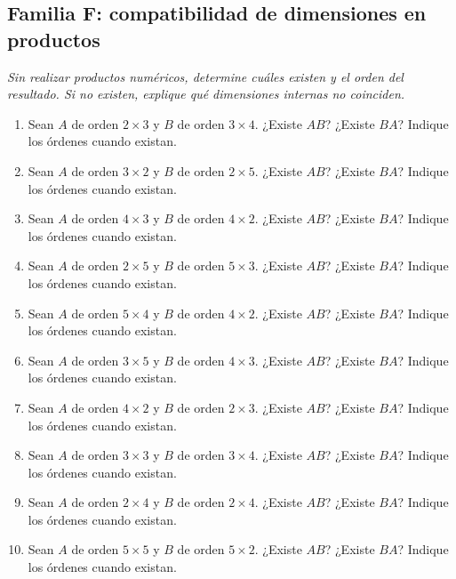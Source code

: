 \documentclass[12pt]{article}
\theoremstyle{remark}
\newcounter{contadorEjercicio}
\newenvironment{listaejercicios}{\begin{enumerate}[label=\textbf{E\arabic*.},leftmargin=2.4em,itemsep=0.52em]\setcounter{enumi}{\value{contadorEjercicio}}}{\setcounter{contadorEjercicio}{\value{enumi}}\end{enumerate}}
\begin{document}
\subsection{Familia F: compatibilidad de dimensiones en productos}\noindent\textit{Sin realizar productos numéricos, determine cuáles existen y el orden del resultado. Si no existen, explique qué dimensiones internas no coinciden.}\par\medskip
\begin{listaejercicios}

\item Sean $A$ de orden $2\times3$ y $B$ de orden $3\times4$. ¿Existe $AB$? ¿Existe $BA$? Indique los órdenes cuando existan.

\item Sean $A$ de orden $3\times2$ y $B$ de orden $2\times5$. ¿Existe $AB$? ¿Existe $BA$? Indique los órdenes cuando existan.

\item Sean $A$ de orden $4\times3$ y $B$ de orden $4\times2$. ¿Existe $AB$? ¿Existe $BA$? Indique los órdenes cuando existan.

\item Sean $A$ de orden $2\times5$ y $B$ de orden $5\times3$. ¿Existe $AB$? ¿Existe $BA$? Indique los órdenes cuando existan.

\item Sean $A$ de orden $5\times4$ y $B$ de orden $4\times2$. ¿Existe $AB$? ¿Existe $BA$? Indique los órdenes cuando existan.

\item Sean $A$ de orden $3\times5$ y $B$ de orden $4\times3$. ¿Existe $AB$? ¿Existe $BA$? Indique los órdenes cuando existan.

\item Sean $A$ de orden $4\times2$ y $B$ de orden $2\times3$. ¿Existe $AB$? ¿Existe $BA$? Indique los órdenes cuando existan.

\item Sean $A$ de orden $3\times3$ y $B$ de orden $3\times4$. ¿Existe $AB$? ¿Existe $BA$? Indique los órdenes cuando existan.

\item Sean $A$ de orden $2\times4$ y $B$ de orden $2\times4$. ¿Existe $AB$? ¿Existe $BA$? Indique los órdenes cuando existan.

\item Sean $A$ de orden $5\times5$ y $B$ de orden $5\times2$. ¿Existe $AB$? ¿Existe $BA$? Indique los órdenes cuando existan.


\end{listaejercicios}
\end{document}
